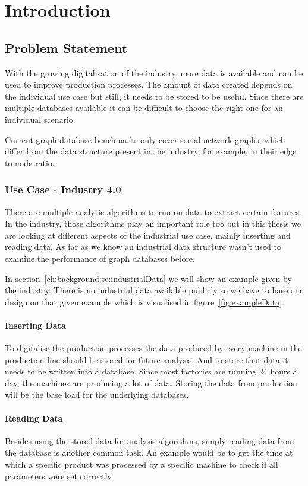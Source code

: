 \chapter{Introduction}
\label{ch:introduction}

\section{Problem Statement}
With the growing digitalisation of the industry,
more data is available and can be used to improve production processes.
The amount of data created depends on the individual use case but still,
it needs to be stored to be useful.
Since there are multiple databases available it can be difficult to choose the right one for an individual scenario.

Current graph database benchmarks only cover social network graphs,
which differ from the data structure present in the industry,
for example,
in their edge to node ratio.

\subsection{Use Case - Industry 4.0}
There are multiple analytic algorithms to run on data to extract certain features.
In the industry,
those algorithms play an important role too but in this thesis we are looking at different aspects of the industrial use case,
mainly inserting and reading data.
As far as we know an industrial data structure wasn't used to examine the performance of graph databases before.

In section~\ref{ch:background:se:industrialData} we will show an example given by the industry.
There is no industrial data available publicly so we have to base our design on that given example which is visualised in figure~\ref{fig:exampleData}.

\subsubsection{Inserting Data}
To digitalise the production processes the data produced by every machine in the production line should be stored for future analysis.
And to store that data it needs to be written into a database.
Since most factories are running 24 hours a day,
the machines are producing a lot of data.
Storing the data from production will be the base load for the underlying databases.

\subsubsection{Reading Data}
Besides using the stored data for analysis algorithms,
simply reading data from the database is another common task.
An example would be to get the time at which a specific product was processed by a specific machine to check if all parameters were set correctly.

